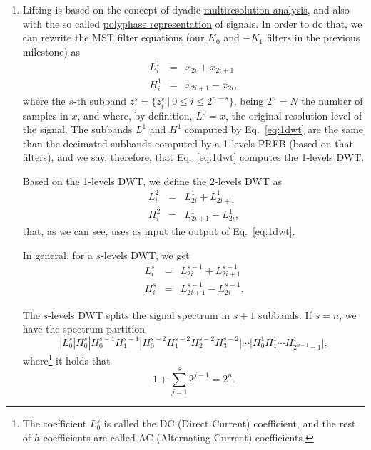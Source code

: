 \begin{enumerate}
\item Lifting is based on the concept of dyadic
  \href{https://en.wikipedia.org/wiki/Multiresolution_analysis}{multiresolution
    analysis}, and also with the so called
  \href{https://en.wikipedia.org/wiki/Polyphase_matrix}{polyphase
    representation} of signals. In order to do that, we can rewrite
  the MST filter equations (our $K_0$ and $-K_1$ filters in the
  previous milestone) as
  \begin{equation}
    \begin{array}{rcl}
      L^1_i & = & x_{2i} + x_{2i+1} \\
      H^1_i & = & x_{2i+1} - x_{2i},
    \end{array}
    \label{eq:1dwt}
  \end{equation}
  where the $s$-th subband $z^s=\{z_i^s~|~0\le i\le 2^{n-s}\}$, being
  $2^n=N$ the number of samples in $x$, and where, by definition, $L^0=x$,
  the original resolution level of the signal. The subbands $L^1$ and
  $H^1$ computed by Eq.~\ref{eq:1dwt} are the same than the decimated
  subbands computed by a 1-levels PRFB (based on that filters), and we
  say, therefore, that Eq.~\ref{eq:1dwt} computes the 1-levels DWT.

  Based on the 1-levels DWT, we define the 2-levels DWT as
  \begin{equation}
    \begin{array}{rcl}
      L^2_i & = & L^1_{2i} + L^1_{2i+1} \\
      H^2_i & = & L^1_{2i+1} - L^1_{2i},
    \end{array}
    \label{eq:2dwt}
  \end{equation}
  that, as we can see, uses as input the output of Eq.~\ref{eq:1dwt}.

  In general, for a $s$-levels DWT, we get
    \begin{equation}
    \begin{array}{rcl}
      L^s_i & = & L^{s-1}_{2i} + L^{s-1}_{2i+1} \\
      H^s_i & = & L^{s-1}_{2i+1} - L^{s-1}_{2i}.
    \end{array}
    \label{eq:2dwt}
  \end{equation}

  The $s$-levels DWT splits the signal spectrum in $s+1$ subbands. If
  $s=n$, we have the spectrum partition
  \begin{equation*}
    | L^s_0 | H^s_0 | H^{s-1}_0 H^{s-1}_1 | H^{s-2}_0 H^{s-2}_1 H^{s-2}_2 H^{s-2}_3 | \cdots | H^1_0 H^1_1 \cdots H^1_{2^{n-1}-1} |,
  \end{equation*}
  where\footnote{The coefficient $L^s_0$ is called the DC (Direct
    Current) coefficient, and the rest of $h$ coefficients are called
    AC (Alternating Current) coefficients.} it holds that
  \begin{equation}
    1+\sum_{j=1}^s 2^{j-1}=2^n.
  \end{equation}


\end{enumerate}
